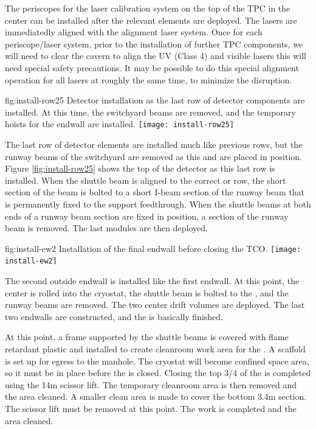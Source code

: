 The periscopes for the laser calibration system on the top of the TPC in the center can be installed after the relevant  elements are deployed. The lasers are immediatedly aligned with the alignment laser system. 
Once for each periscope/laser system, prior to the installation of further TPC components, we will need to clear the cavern to align the UV (Class 4) and visible lasers this will need special safety precautions. 
It may be possible to do this special alignment operation for all lasers at roughly the same time, to minimize the disruption.

\begin{dunefigure}{fig:install-row25}
  {Detector installation as the last row of detector components are installed. At this time, the switchyard beams are removed, and the temporary hoists for the endwall are installed.}
\texttt{[image: install-row25]}
\end{dunefigure}


The last row of detector elements are installed much like previous rows, but the runway beams of the  switchyard are removed as this  and  are placed in position. Figure \ref{fig:install-row25} shows the top of the detector as this last row is installed. When the shuttle beam is aligned to the correct  or  row, the short section of the beam is bolted to a short I-beam section of the runway beam that is permanently fixed to the  support feedthrough. When the shuttle beams at both ends of a runway beam section are fixed in position, a section of the runway beam is removed. The last  modules are then deployed. 


\begin{dunefigure}{fig:install-ew2}
  {Installation of the final endwall before closing the TCO.}
\texttt{[image: install-ew2]}
\end{dunefigure}

The second outside endwall is installed like the first endwall. At this point, the center  is rolled into the cryostat, the shuttle beam is bolted to the , and the runway beams are removed. The two center drift volumes  are deployed. The last two endwalls are constructed, and the  is basically finished. 

At this point, a frame supported by the shuttle beams is covered with flame retardant plastic and installed to create cleanroom work area for the .  A scaffold is set up for egress to the manhole. The cryostat will become confined space area, so it must be in place before the  is closed.  Closing the top 3/4 of the  is completed using the 14m scissor lift. The temporary cleanroom area is then removed and the area cleaned. A smaller clean area is made to cover the bottom 3.4m  section.  The scissor lift must be removed at this point. The  work is completed and the area cleaned.

